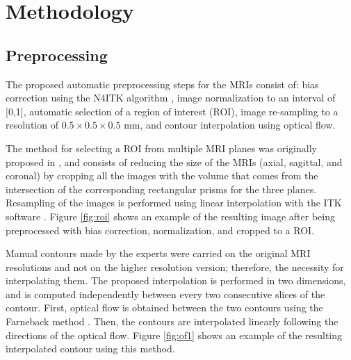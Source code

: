 \section{Methodology}
\label{sec:methods}



\subsection{Preprocessing}
\label{subsec:prepro}
The proposed automatic preprocessing steps for the MRIs consist of: bias correction using the N4ITK algorithm \cite{n4itk}, image normalization to an interval of [0,1], automatic selection of a region of interest (ROI), image re-sampling to a resolution of $0.5 \times 0.5 \times 0.5$ mm, and contour interpolation using optical flow.  

The method for selecting a ROI from multiple MRI planes was originally proposed in \cite{anneke}, and consists of reducing the size of the MRIs (axial, sagittal, and coronal) by cropping all the images with the volume that comes from the intersection of the corresponding rectangular prisms for the three planes. Resampling of the images is performed using linear interpolation with the ITK software \cite{itk}.  Figure \ref{fig:roi} shows an example of the resulting image after being preprocessed with bias correction, normalization, and cropped to a ROI. 

Manual contours made by the experts were carried on the original MRI resolutions and not on the higher resolution version; therefore, the necessity for interpolating them.  The proposed interpolation is performed in two dimensions, and is computed independently between every two consecutive slices of the contour.  First, optical flow is obtained between the two contours using the  Farneback method \cite{optflow}. Then, the contours are interpolated linearly following the directions of the optical flow. Figure \ref{fig:of1} shows an example of the resulting interpolated contour using this method. 

